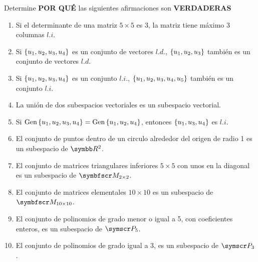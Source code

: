 \item Determine \textbf{POR QUÉ} las siguientes afirmaciones son \textbf{VERDADERAS}
    \begin{enumerate}[label=\listAlph]
        \item Si el determinante de una matriz \(5 \times 5\) es 3, la matriz tiene máximo 3 columnas \(l.i\).
        \item Si \(\left\{ u_1, u_2, u_3, u_4 \right\}\) es un conjunto de vectores \(l.d\)., \(\left\{ u_1, u_2, u_3 \right\}\) también es un conjunto de vectores \(l.d\).
        \item Si \(\left\{ u_1, u_2, u_3, u_4 \right\}\) es un conjunto \(l.i\)., \(\left\{ u_1, u_2, u_3, u_4, u_5 \right\}\) también es un conjunto \(l.i\).
        \item La unión de dos subespacios vectoriales es un subespacio vectorial.
        \item Si \(\text{Gen} \left\{ u_1, u_2, u_3, u_4 \right\} = \text{Gen} \left\{ u_1, u_2, u_4 \right\}\), entonces \(\left\{ u_1, u_3, u_4 \right\}\) es \(l.i\).
        \item El conjunto de puntos dentro de un circulo alrededor del origen de radio 1 es un subespacio de \(\realR^2\).
        \item El conjunto de matrices triangulares inferiores \(5 \times 5\) con unos en la diagonal es un subespacio de \(\fm_{2 \times 2}\).
        \item El conjunto de matrices elementales \(10 \times 10\) es un subespacio de \(\fm_{10 \times 10}\).
        \item El conjunto de polinomios de grado menor o igual a 5, con coeficientes enteros, es un subespacio de \(\fp_5\).
        \item El conjunto de polinomios de grado igual a 3, es un subespacio de \(\fp_3\).
    \end{enumerate}
